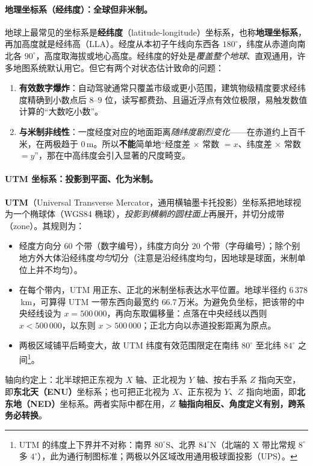\paragraph{地理坐标系（经纬度）：全球但非米制。}
地球上最常见的坐标系是\textbf{经纬度}（latitude-longitude）坐标系，也称\textbf{地理坐标系}，再加高度就是经纬高（LLA）\cite{gao2023slamad}。经度从本初子午线向东西各 $180^\circ$，纬度从赤道向南北各 $90^\circ$，高度取海拔或地心高度。经纬度的好处是\emph{覆盖整个地球}、直观通用，许多地图系统默认用它。但它有两个对状态估计致命的问题\cite{gao2023slamad}：
\begin{enumerate}
  \item \textbf{有效数字爆炸}：自动驾驶通常只覆盖市级或更小范围，建筑物级精度要求经纬度精确到小数点后 $8$–$9$ 位，读写都费劲、且逼近浮点有效位极限，易触发数值计算的“大数吃小数”。
  \item \textbf{与米制非线性}：一度经度对应的地面距离\emph{随纬度剧烈变化}——在赤道约上百千米，在两极趋于 $0$\,m。所以\textbf{不能}简单地“经度差 $\times$ 常数 $= x$、纬度差 $\times$ 常数 $= y$”，那在中高纬度会引入显著的尺度畸变。
\end{enumerate}

\paragraph{UTM 坐标系：投影到平面、化为米制。}
\textbf{UTM}（Universal Transverse Mercator，通用横轴墨卡托投影）坐标系把地球视为一个椭球体（WGS84 椭球），\emph{投影到横躺的圆柱面上}再展开，并切分成带（zone）\cite{gao2023slamad}。其规则为：
\begin{itemize}
  \item 经度方向分 $60$ 个带（数字编号），纬度方向分 $20$ 个带（字母编号）；除个别地方外大体沿经纬度\emph{均匀}切分（注意是沿经纬度均匀，因地球是球面，米制单位上并不均匀）。
  \item 在每个带内，UTM 用正东、正北的米制坐标表达水平位置。地球半径约 $6\,378$\,km，可算得 UTM 一带东西向最宽约 $66.7$\,万米。为避免负坐标，把该带的中央经线设为 $x=500\,000$，再向东取偏移量：点落在中央经线以西则 $x<500\,000$，以东则 $x>500\,000$；正北方向以赤道投影距离为原点。
  \item 两极区域铺平后畸变大，故 UTM 纬度有效范围限定在南纬 $80^\circ$ 至北纬 $84^\circ$ 之间\cite{gao2023slamad}\footnote{UTM 的纬度上下界并不对称：南界 $80^\circ\mathrm{S}$、北界 $84^\circ\mathrm{N}$（北端的 X 带比常规 $8^\circ$ 多 $4^\circ$），此为通行制图标准；两极以外区域改用通用极球面投影（UPS）。}。
\end{itemize}
轴向约定上：北半球把正东视为 $X$ 轴、正北视为 $Y$ 轴、按右手系 $Z$ 指向天空，即\textbf{东北天（ENU）}坐标系；也可把正北视为 $X$、正东视为 $Y$、$Z$ 指向地面，即\textbf{北东地（NED）}坐标系。两者实际中都在用，\textbf{$Z$ 轴指向相反、角度定义有别，跨系务必转换}\cite{gao2023slamad}。

